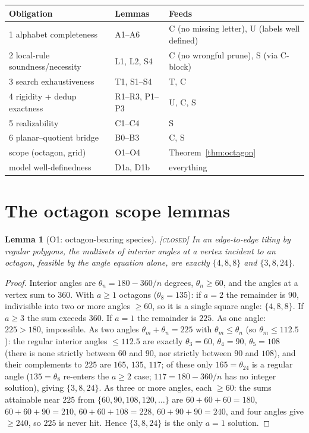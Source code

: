 \documentclass[11pt]{article}
\newtheorem{lemma}[theorem]{Lemma}
\theoremstyle{definition}
\newcommand{\CLOSED}{\textnormal{\textsc{[closed]}}}
\begin{document}
\begin{center}
\small
\begin{tabular}{lll}
Obligation & Lemmas & Feeds \\
\hline
1 alphabet completeness & A1--A6 & C (no missing letter), U (labels well defined) \\
2 local-rule soundness/necessity & L1, L2, S4 & C (no wrongful prune), S (via C-block) \\
3 search exhaustiveness & T1, S1--S4 & T, C \\
4 rigidity + dedup exactness & R1--R3, P1--P3 & U, C, S \\
5 realizability & C1--C4 & S \\
6 planar--quotient bridge & B0--B3 & C, S \\
scope (octagon, grid) & O1--O4 & Theorem~\ref{thm:octagon} \\
model well-definedness & D1a, D1b & everything \\
\end{tabular}
\end{center}

\section{The octagon scope lemmas}\label{sec:octagon}

\begin{lemma}[O1: octagon-bearing species]\label{lem:O1} \CLOSED\;
In an edge-to-edge tiling by regular polygons, the multisets of interior angles at a
vertex incident to an octagon, feasible by the angle equation alone, are exactly
$\{4,8,8\}$ and $\{3,8,24\}$.
\end{lemma}

\begin{proof}
Interior angles are $\theta_n = 180 - 360/n$ degrees, $\theta_n \ge 60$, and the angles at
a vertex sum to $360$. With $a \ge 1$ octagons ($\theta_8 = 135$): if $a = 2$ the
remainder is $90$, indivisible into two or more angles $\ge 60$, so it is a single square
angle: $\{4,8,8\}$. If $a \ge 3$ the sum exceeds $360$. If $a = 1$ the remainder is $225$.
As one angle: $225 > 180$, impossible. As two angles $\theta_m + \theta_n = 225$ with
$\theta_m \le \theta_n$ (so $\theta_m \le 112.5$): the regular interior angles $\le 112.5$
are exactly $\theta_3 = 60$, $\theta_4 = 90$, $\theta_5 = 108$ (there is none strictly
between $60$ and $90$, nor strictly between $90$ and $108$), and their complements to
$225$ are $165$, $135$, $117$; of these only $165 = \theta_{24}$ is a regular angle
($135 = \theta_8$ re-enters the $a \ge 2$ case; $117 = 180 - 360/n$ has no integer
solution), giving $\{3,8,24\}$. As three or more angles, each $\ge 60$: the sums
attainable near $225$ from $\{60, 90, 108, 120, \dots\}$ are
$60{+}60{+}60 = 180$, $60{+}60{+}90 = 210$, $60{+}60{+}108 = 228$, $60{+}90{+}90 = 240$,
and four angles give $\ge 240$, so $225$ is never hit. Hence $\{3,8,24\}$ is the only
$a=1$ solution.
\end{proof}
\end{document}
